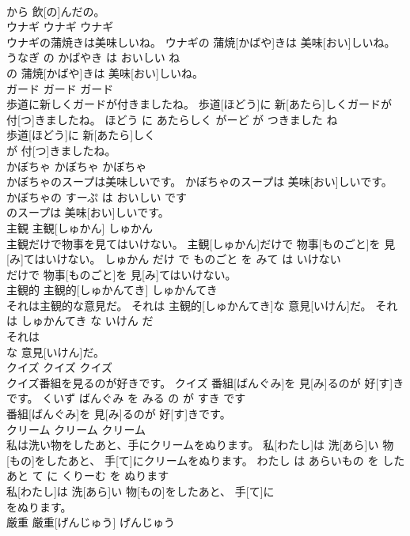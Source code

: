 \documentclass[8pt]{extreport}
\begin{document}
\begin{CJK}{UTF8}{min}
\\	から 飲[の]んだの。			
\\	ウナギ	ウナギ	ウナギ	
\\	ウナギの蒲焼きは美味しいね。	ウナギの 蒲焼[かばや]きは 美味[おい]しいね。	うなぎ の かばやき は おいしい ね	
\\	の 蒲焼[かばや]きは 美味[おい]しいね。			
\\	ガード	ガード	ガード	
\\	歩道に新しくガードが付きましたね。	歩道[ほどう]に 新[あたら]しくガードが 付[つ]きましたね。	ほどう に あたらしく がーど が つきました ね	
\\	歩道[ほどう]に 新[あたら]しく
\\	が 付[つ]きましたね。			
\\	かぼちゃ	かぼちゃ	かぼちゃ	
\\	かぼちゃのスープは美味しいです。	かぼちゃのスープは 美味[おい]しいです。	かぼちゃの すーぷ は おいしい です	
\\	のスープは 美味[おい]しいです。			
\\	主観	主観[しゅかん]	しゅかん	
\\	主観だけで物事を見てはいけない。	主観[しゅかん]だけで 物事[ものごと]を 見[み]てはいけない。	しゅかん だけ で ものごと を みて は いけない	
\\	だけで 物事[ものごと]を 見[み]てはいけない。			
\\	主観的	主観的[しゅかんてき]	しゅかんてき	
\\	それは主観的な意見だ。	それは 主観的[しゅかんてき]な 意見[いけん]だ。	それ は しゅかんてき な いけん だ	
\\	それは
\\	な 意見[いけん]だ。			
\\	クイズ	クイズ	クイズ	
\\	クイズ番組を見るのが好きです。	クイズ 番組[ばんぐみ]を 見[み]るのが 好[す]きです。	くいず ばんぐみ を みる の が すき です	
\\	番組[ばんぐみ]を 見[み]るのが 好[す]きです。			
\\	クリーム	クリーム	クリーム	
\\	私は洗い物をしたあと、手にクリームをぬります。	私[わたし]は 洗[あら]い 物[もの]をしたあと、 手[て]にクリームをぬります。	わたし は あらいもの を した あと て に くりーむ を ぬります	
\\	私[わたし]は 洗[あら]い 物[もの]をしたあと、 手[て]に
\\	をぬります。			
\\	厳重	厳重[げんじゅう]	げんじゅう	

\end{CJK}
\end{document}
